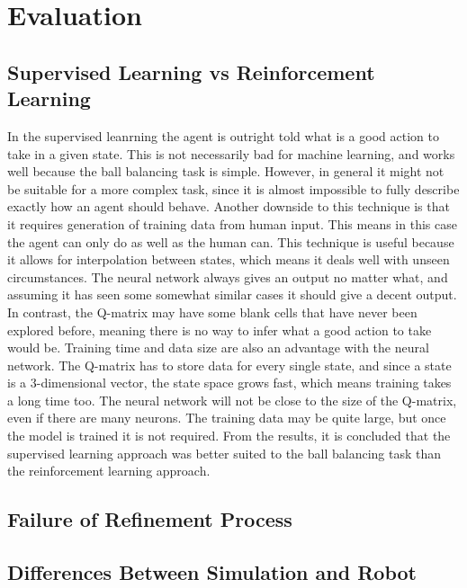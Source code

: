\documentclass[12pt,a4paper]{article}
\begin{document}
\section{Evaluation}
\subsection{Supervised Learning vs Reinforcement Learning}
In the supervised leanrning the agent is outright told what is a good action to take in a given state. This is not necessarily bad for machine learning, and works well because the ball balancing task is simple. However, in general it might not be suitable for a more complex task, since it is almost impossible to fully describe exactly how an agent should behave. Another downside to this technique is that it requires generation of training data from human input. This means in this case the agent can only do as well as the human can. 
This technique is useful because it allows for interpolation between states, which means it deals well with unseen circumstances. The neural network always gives an output no matter what, and assuming it has seen some somewhat similar cases it should give a decent output. In contrast, the Q-matrix may have some blank cells that have never been explored before, meaning there is no way to infer what a good action to take would be. Training time and data size are also an advantage with the neural network. The Q-matrix has to store data for every single state, and since a state is a 3-dimensional vector, the state space grows fast, which means training takes a long time too. The neural network will not be close to the size of the Q-matrix, even if there are many neurons. The training data may be quite large, but once the model is trained it is not required. 
From the results, it is concluded that the supervised learning approach was better suited to the ball balancing task than the reinforcement learning approach. 

\subsection{Failure of Refinement Process}

\subsection{Differences Between Simulation and Robot}
\end{document}
